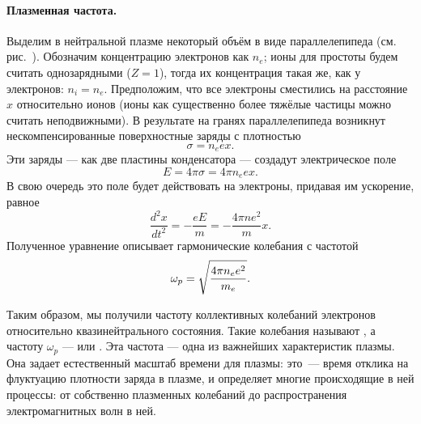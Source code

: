 \paragraph{Плазменная частота.}
Выделим в нейтральной плазме некоторый объём в виде параллелепипеда
(см. рис.~).
Обозначим концентрацию электронов как $n_e$; ионы для простоты будем считать
однозарядными ($Z=1$), тогда их концентрация такая же, как у электронов: $n_i=n_e$.
Предположим, что все электроны сместились на расстояние $x$ относительно ионов
(ионы как существенно более тяжёлые частицы можно считать неподвижными).
В результате на гранях параллелепипеда возникнут нескомпенсированные
поверхностные заряды с плотностью
\begin{equation*}
    \sigma = n_e e x.
\end{equation*}
Эти заряды --- как две пластины конденсатора --- создадут электрическое поле
\begin{equation*}
    E=4\pi\sigma=4\pi n_e e x.
\end{equation*}
В свою очередь это поле будет действовать на электроны,
придавая им ускорение, равное
\begin{equation*}
    \frac{d^2x}{dt^2}=-\frac{eE}{m}=-\frac{4\pi ne^2}{m}x.
\end{equation*}
Полученное уравнение описывает гармонические колебания с частотой
\begin{equation}
    \eqmark{5.16}
    \omega_p=\sqrt{\frac{4\pi n_e e^2}{m_e}}.
\end{equation}

Таким образом, мы получили частоту коллективных колебаний
электронов относительно квазинейтрального состояния. Такие колебания
называют , а частоту $\omega_p$ ---
 или . Эта частота ---
одна из важнейших характеристик плазмы.
Она задает естественный масштаб времени для плазмы: это~--- время
отклика на флуктуацию плотности заряда в плазме,
и определяет многие происходящие в ней процессы: от собственно плазменных
колебаний до распространения электромагнитных волн в ней.


